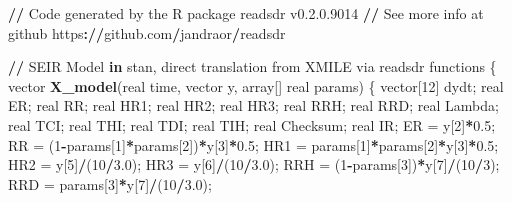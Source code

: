 \documentclass[10pt,letterpaper]{article}
\newenvironment{Shaded}{\begin{snugshade}}{\end{snugshade}}
\newcommand{\ControlFlowTok}[1]{\textcolor[rgb]{0.13,0.29,0.53}{\textbf{#1}}}
\newcommand{\DecValTok}[1]{\textcolor[rgb]{0.00,0.00,0.81}{#1}}
\newcommand{\ErrorTok}[1]{\textcolor[rgb]{0.64,0.00,0.00}{\textbf{#1}}}
\newcommand{\FloatTok}[1]{\textcolor[rgb]{0.00,0.00,0.81}{#1}}
\newcommand{\FunctionTok}[1]{\textcolor[rgb]{0.13,0.29,0.53}{\textbf{#1}}}
\newcommand{\NormalTok}[1]{#1}
\newcommand{\OtherTok}[1]{\textcolor[rgb]{0.56,0.35,0.01}{#1}}
\newcommand{\SpecialCharTok}[1]{\textcolor[rgb]{0.81,0.36,0.00}{\textbf{#1}}}
\begin{document}
\begin{Shaded}
\begin{Highlighting}[]
\SpecialCharTok{/}\ErrorTok{/}\NormalTok{ Code generated by the R package readsdr v0.}\DecValTok{2}\NormalTok{.}\FloatTok{0.9014}
\SpecialCharTok{/}\ErrorTok{/}\NormalTok{ See more info at github https}\SpecialCharTok{:}\ErrorTok{//}\NormalTok{github.com}\SpecialCharTok{/}\NormalTok{jandraor}\SpecialCharTok{/}\NormalTok{readsdr}

\SpecialCharTok{/}\ErrorTok{/}\NormalTok{ SEIR Model }\ControlFlowTok{in}\NormalTok{ stan, direct translation from XMILE via readsdr}
\NormalTok{functions \{}
\NormalTok{  vector }\FunctionTok{X\_model}\NormalTok{(real time, vector y, array[] real params) \{}
\NormalTok{    vector[}\DecValTok{12}\NormalTok{] dydt;}
\NormalTok{    real ER;}
\NormalTok{    real RR;}
\NormalTok{    real HR1;}
\NormalTok{    real HR2;}
\NormalTok{    real HR3;}
\NormalTok{    real RRH;}
\NormalTok{    real RRD;}
\NormalTok{    real Lambda;}
\NormalTok{    real TCI;}
\NormalTok{    real THI;}
\NormalTok{    real TDI;}
\NormalTok{    real TIH;}
\NormalTok{    real Checksum;}
\NormalTok{    real IR;}
\NormalTok{    ER }\OtherTok{=}\NormalTok{ y[}\DecValTok{2}\NormalTok{]}\SpecialCharTok{*}\FloatTok{0.5}\NormalTok{;}
\NormalTok{    RR }\OtherTok{=}\NormalTok{ (}\DecValTok{1}\SpecialCharTok{{-}}\NormalTok{params[}\DecValTok{1}\NormalTok{]}\SpecialCharTok{*}\NormalTok{params[}\DecValTok{2}\NormalTok{])}\SpecialCharTok{*}\NormalTok{y[}\DecValTok{3}\NormalTok{]}\SpecialCharTok{*}\FloatTok{0.5}\NormalTok{;}
\NormalTok{    HR1 }\OtherTok{=}\NormalTok{ params[}\DecValTok{1}\NormalTok{]}\SpecialCharTok{*}\NormalTok{params[}\DecValTok{2}\NormalTok{]}\SpecialCharTok{*}\NormalTok{y[}\DecValTok{3}\NormalTok{]}\SpecialCharTok{*}\FloatTok{0.5}\NormalTok{;}
\NormalTok{    HR2 }\OtherTok{=}\NormalTok{ y[}\DecValTok{5}\NormalTok{]}\SpecialCharTok{/}\NormalTok{(}\DecValTok{10}\SpecialCharTok{/}\FloatTok{3.0}\NormalTok{);}
\NormalTok{    HR3 }\OtherTok{=}\NormalTok{ y[}\DecValTok{6}\NormalTok{]}\SpecialCharTok{/}\NormalTok{(}\DecValTok{10}\SpecialCharTok{/}\FloatTok{3.0}\NormalTok{);}
\NormalTok{    RRH }\OtherTok{=}\NormalTok{ (}\DecValTok{1}\SpecialCharTok{{-}}\NormalTok{params[}\DecValTok{3}\NormalTok{])}\SpecialCharTok{*}\NormalTok{y[}\DecValTok{7}\NormalTok{]}\SpecialCharTok{/}\NormalTok{(}\DecValTok{10}\SpecialCharTok{/}\DecValTok{3}\NormalTok{);}
\NormalTok{    RRD }\OtherTok{=}\NormalTok{ params[}\DecValTok{3}\NormalTok{]}\SpecialCharTok{*}\NormalTok{y[}\DecValTok{7}\NormalTok{]}\SpecialCharTok{/}\NormalTok{(}\DecValTok{10}\SpecialCharTok{/}\FloatTok{3.0}\NormalTok{);}

\end{Highlighting}
\end{Shaded}
\end{document}
